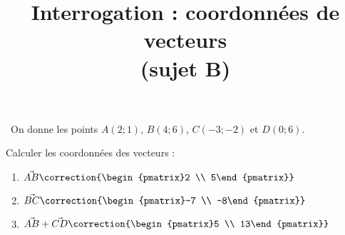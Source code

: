 \documentclass[
	classe=$2^{de}$,
	landscape,
	twocolumn,
]{évaluation}
\begin{document}
\begin{exercice}\
	On donne les points $A(2; 1)$, $B(4; 6)$, $C(-3; -2)$ et $D(0; 6)$.

	Calculer les coordonnées des vecteurs :
	\begin{enumerate}
		\setlength{\itemsep}{0.5em}
		\item $\vec{AB}\correction{\begin{pmatrix}2 \\ 5\end{pmatrix}}$
		\item $\vec{BC}\correction{\begin{pmatrix}-7 \\ -8\end{pmatrix}}$
		\item $\vec{AB} + \vec{CD}\correction{\begin{pmatrix}5 \\ 13\end{pmatrix}}$
	\end{enumerate}
\end{exercice}

\setcounter{exercice}{1}
\newpage

\title{Interrogation : coordonnées de vecteurs\\ (sujet B)}
\maketitle
\end{document}
